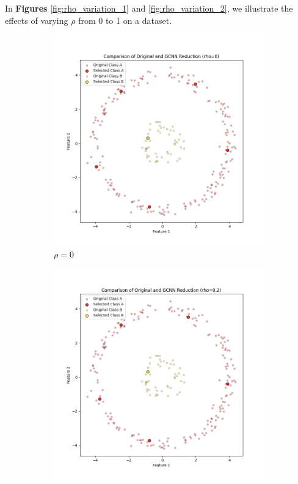 In \textbf{Figures} \ref{fig:rho_variation_1} and \ref{fig:rho_variation_2}, we illustrate the effects of varying $\rho$ from 0 to 1 on a dataset.

\begin{figure}[ht]
	\centering
	\begin{subfigure}[b]{0.3\textwidth}
		\centering
		\includegraphics[width=\textwidth]{figures/gcnn/comparison_plot_rho_0.png}
		\caption{$\rho = 0$}
		\label{fig:rho0}
	\end{subfigure}
	\hfill
	\begin{subfigure}[b]{0.3\textwidth}
		\centering
		\includegraphics[width=\textwidth]{figures/gcnn/comparison_plot_rho_0.2.png}

\end{subfigure}
\end{figure}
